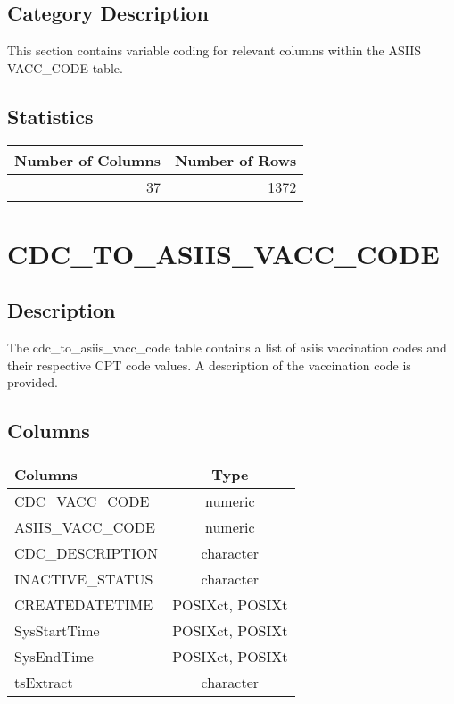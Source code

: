 \documentclass[
  letterpaper,
  DIV=11,
  numbers=noendperiod]{scrreprt}
\begin{document}
\hypertarget{category-description-2}{%
\section*{Category Description}\label{category-description-2}}

This section contains variable coding for relevant columns within the
ASIIS VACC\_CODE table.

\hypertarget{statistics-2}{%
\section*{Statistics}\label{statistics-2}}

\begin{longtable}{rr}
\toprule
Number of Columns & Number of Rows \\ 
\midrule
37 & 1372 \\ 
\bottomrule
\end{longtable}

\hypertarget{cdc_to_asiis_vacc_code}{%
\chapter*{CDC\_TO\_ASIIS\_VACC\_CODE}\label{cdc_to_asiis_vacc_code}}

\hypertarget{description-3}{%
\section*{Description}\label{description-3}}

The cdc\_to\_asiis\_vacc\_code table contains a list of asiis
vaccination codes and their respective CPT code values. A description of
the vaccination code is provided.

\hypertarget{columns-3}{%
\section*{Columns}\label{columns-3}}

\begin{longtable}{lc}
\toprule
Columns & Type \\ 
\midrule
CDC\_VACC\_CODE & numeric \\ 
ASIIS\_VACC\_CODE & numeric \\ 
CDC\_DESCRIPTION & character \\ 
INACTIVE\_STATUS & character \\ 
CREATEDATETIME & POSIXct, POSIXt \\ 
SysStartTime & POSIXct, POSIXt \\ 
SysEndTime & POSIXct, POSIXt \\ 
tsExtract & character \\ 
\bottomrule
\end{longtable}
\end{document}
